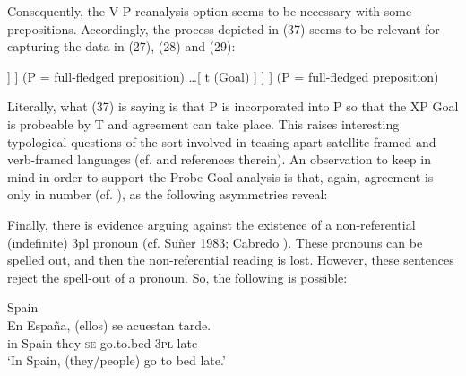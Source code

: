 \documentclass[output=paper]{langsci/langscibook}
\begin{document}
Consequently, the V-P reanalysis option seems to be necessary with some prepositions. Accordingly, the process depicted in (37) seems to be relevant for capturing the data in (27), (28) and (29):


\ea%
    \label{ex:gallego:37}
    \ea\onehalfspacing\relax [ SE \ConnectTail{\textbf{T}} ($\varphi $-Probe)  [\textsubscript{VP} V \ldots\xspace [  P \ConnectHead{\textbf{XP}} (Goal) ] ] ] (P = full-fledged preposition) 
    \ex\onehalfspacing\relax [ SE \ConnectTail{\textbf{T}} ($\varphi $-Probe)  [\textsubscript{VP} [V-P] \ldots\xspace [ t   (Goal) ] ] ] (P = full-fledged preposition)
    \z
\z


Literally, what (37) is saying is that P is incorporated into P so that the XP Goal is probeable by T and agreement can take place. This raises interesting typological questions of the sort involved in teasing apart satellite-framed and verb-framed languages (cf. \citealt{Mateu2012} and references therein). An observation to keep in mind in order to support the Probe-Goal analysis is that, again, agreement is only in number (cf. \citealt{Etxepare2006}), as the following asymmetries reveal:



    \z
    
Finally, there is evidence arguing against the existence of a non-referential (indefinite) 3pl pronoun (cf. Suñer 1983; Cabredo \citealt{Hofherr2003}). These pronouns can be spelled out, and then the non-referential reading is lost. However, these sentences reject the spell-out of a pronoun. So, the following is possible:



\ea%
    Spain\label{ex:gallego:39}\\
    \gll En España, (ellos)  se  acuestan            tarde.    \\
         in  Spain       they   \textsc{se} go.to.bed-\textsc{3pl}   late\\
    \glt ‘In Spain, (they/people) go to bed late.’
    \z
\end{document}
